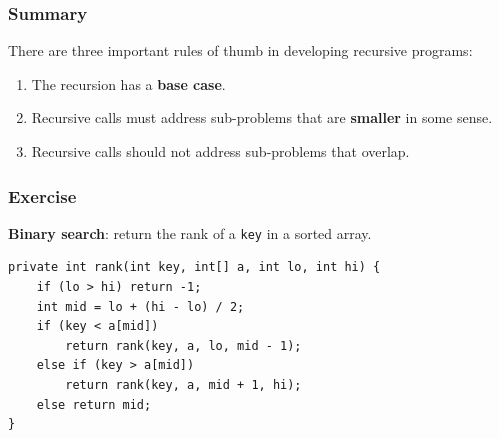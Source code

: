 \documentclass[aspectratio=169, 14pt]{beamer}
\begin{document}
\begin{frame}
\frametitle{Summary}

{\large {}} There are three important rules of thumb in developing recursive programs:

\begin{enumerate}
    \item The recursion has a \textbf{base case}.
    \item Recursive calls must address sub-problems that are \textbf{smaller} in some sense.
    \item Recursive calls should not address sub-problems that overlap.
\end{enumerate}
\end{frame}

\begin{frame}[fragile]
    \frametitle{Exercise}
{\large {}} \textbf{Binary search}: return the rank of a \texttt{key} in a sorted array.    

  \begin{verbatim}
private int rank(int key, int[] a, int lo, int hi) {
    if (lo > hi) return -1;
    int mid = lo + (hi - lo) / 2;
    if (key < a[mid]) 
        return rank(key, a, lo, mid - 1);
    else if (key > a[mid])
        return rank(key, a, mid + 1, hi);
    else return mid;
}
  \end{verbatim}

\end{frame}
\end{document}
